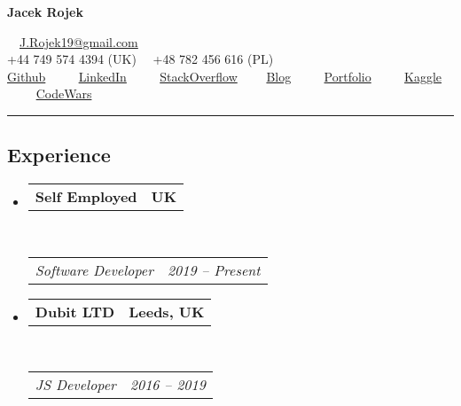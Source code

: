 \documentclass[10pt,letterpaper]{article}
\makeatletter
\newcommand{\headerrow}[2]
{\begin{tabular*}{\linewidth}{l@{\extracolsep{\fill}}r}
	#1 &
	#2 \\
\end{tabular*}}
\makeatother
\begin{document}
\begin{center}
{\LARGE \textbf{Jacek Rojek}}
\end{center}
\begin{center}
\ \ \href{mailto:j.rojek19@gmail.com}{J.Rojek19@gmail.com}
	\\
+44 749 574 4394 (UK)\ \ \textbullet
+48	782 456 616 (PL)\ \ \textbullet
\\
\href{https://github.com/JacekRojek}{Github} \ \ \textbullet
\ \ \href{https://www.linkedin.com/in/jacek-rojek-b7a396105/}{LinkedIn} \ \ \textbullet
\ \ \href{https://stackoverflow.com/users/4375103/jacek-rojek}{StackOverflow}\ \ \textbullet
\ \ \href{https://indiedevart.wordpress.com/}{Blog} \ \ \textbullet
\ \ \href{https://jacekrojek.github.io/JacekRojek-Portfolio/}{Portfolio} \ \ \textbullet
\ \ \href{https://www.kaggle.com/jacek123}{Kaggle} \ \ \textbullet
\ \ \href{https://www.codewars.com/users/JacekRojek}{CodeWars}

\end{center}

\hrule
\vspace{-0.4em}
\subsection*{Experience}

\begin{itemize}
	\parskip=0.1em

  \item
	\headerrow
		{\textbf{Self Employed}}
		{\textbf{UK}}
	\\
	\headerrow
		{\emph{Software Developer}}
		{\emph{2019 -- Present}}

	\item
	\headerrow
		{\textbf{Dubit LTD}}
		{\textbf{Leeds, UK}}
	\\
	\headerrow
		{\emph{JS Developer}}
		{\emph{2016 -- 2019}}
\end{itemize}
\end{document}
